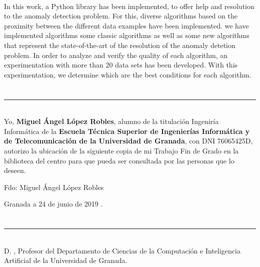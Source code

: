 \vspace{0.7cm}
\\

In this work, a Python library has been implemented, to offer help and resolution to the
anomaly detection problem. For this, diverse algorithms based on the proximity between the
different data examples have been implemented. we have implemented algorithms some classic
algorithms as well as some new algorithms that represent the state-of-the-art of the resolution
of the anomaly detetion problem. In order to analyze and
verify the quality of each algorithm, an experimentation with more than 20 data sets has been developed.
With this experimentation, we determine which are the best conditions for each algorithm.

\chapter*{}
\thispagestyle{empty}

\noindent\rule[-1ex]{\textwidth}{2pt}\\[4.5ex]

Yo, \textbf{Miguel Ángel López Robles}, alumno de la titulación Ingeniría Informática de la \textbf{Escuela Técnica Superior
de Ingenierías Informática y de Telecomunicación de la Universidad de Granada}, con DNI 76065425D, autorizo la
ubicación de la siguiente copia de mi Trabajo Fin de Grado en la biblioteca del centro para que pueda ser
consultada por las personas que lo deseen.

\vspace{6cm}

\noindent Fdo: Miguel Ángel López Robles

\vspace{2cm}

\begin{flushright}
Granada a 24 de junio de 2019 .
\end{flushright}


\chapter*{}
\thispagestyle{empty}

\noindent\rule[-1ex]{\textwidth}{2pt}\\[4.5ex]

D. \textbf{\myProf}, Profesor del Departamento de Ciencias de la Computación e Inteligencia Artificial  de la Universidad de Granada.

